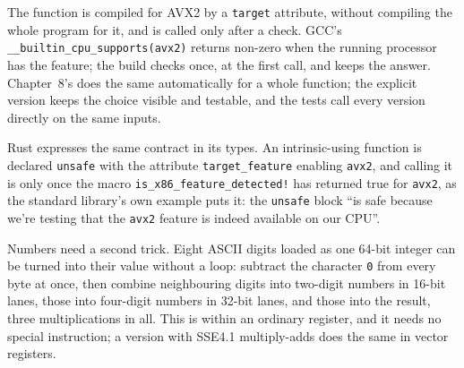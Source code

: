 \label{lst:ll:vector-instructions-and-data-parallel-code:find}

The function is compiled for AVX2 by a \texttt{target} attribute, without compiling the whole program for it, and is called
only after a check. GCC's \texttt{\_\_builtin\_cpu\_supports(\textquotedbl{}avx2\textquotedbl{})} returns non-zero when the running processor has the
feature; the build checks once, at the first call, and keeps the answer. Chapter~8's  does the same
automatically for a whole function; the explicit version keeps the choice visible and testable, and the tests call every
version directly on the same inputs.

\label{lst:ll:vector-instructions-and-data-parallel-code:dispatch}

Rust expresses the same contract in its types. An intrinsic-using function is declared \texttt{unsafe} with the attribute \texttt{target\_feature} enabling \texttt{avx2}, and calling it is 
only once the macro \texttt{is\_x86\_feature\_detected!} has returned true for \texttt{avx2}, as the standard library's own example puts it: the
\texttt{unsafe} block ``is safe because we're testing that the \texttt{avx2} feature is indeed available on our CPU''.

\label{lst:ll:vector-instructions-and-data-parallel-code:rust}

Numbers need a second trick. Eight ASCII digits loaded as one 64-bit integer can be turned into their value without a loop:
subtract the character \texttt{0} from every byte at once, then combine neighbouring digits into two-digit numbers in 16-bit
lanes, those into four-digit numbers in 32-bit lanes, and those into the result, three multiplications in all. This is 
within an ordinary register, and it needs no special instruction; a version with SSE4.1 multiply-adds does the same in vector
registers.

\label{lst:ll:vector-instructions-and-data-parallel-code:swar}

